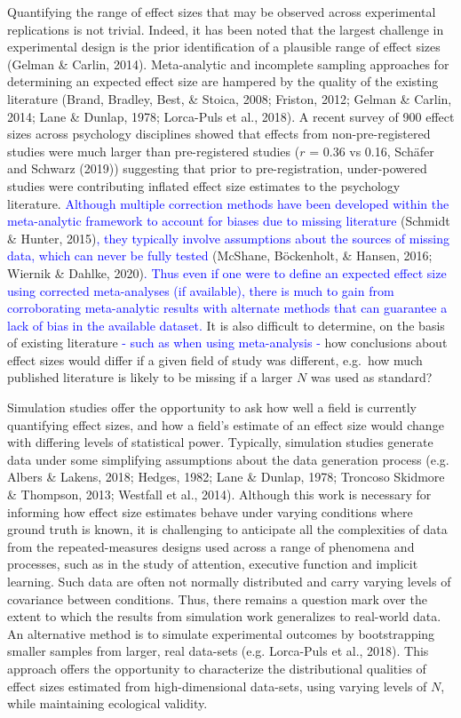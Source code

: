 \documentclass[
  man]{apa6}
\begin{document}
Quantifying the range of effect sizes that may be observed across experimental replications is not trivial. Indeed, it has been noted that the largest challenge in experimental design is the prior identification of a plausible range of effect sizes (Gelman \& Carlin, 2014). Meta-analytic and incomplete sampling approaches for determining an expected effect size are hampered by the quality of the existing literature (Brand, Bradley, Best, \& Stoica, 2008; Friston, 2012; Gelman \& Carlin, 2014; Lane \& Dunlap, 1978; Lorca-Puls et al., 2018). A recent survey of 900 effect sizes across psychology disciplines showed that effects from non-pre-registered studies were much larger than pre-registered studies (\(r\) = 0.36 vs 0.16, Schäfer and Schwarz (2019)) suggesting that prior to pre-registration, under-powered studies were contributing inflated effect size estimates to the psychology literature. \textcolor{blue}{Although multiple correction methods have been developed within the meta-analytic framework to account for biases due to missing literature} (Schmidt \& Hunter, 2015)\textcolor{blue}{, they typically involve assumptions about the sources of missing data, which can never be fully tested} (McShane, Böckenholt, \& Hansen, 2016; Wiernik \& Dahlke, 2020)\textcolor{blue}{. Thus even if one were to define an expected effect size using corrected meta-analyses (if available), there is much to gain from corroborating meta-analytic results with alternate methods that can guarantee a lack of bias in the available dataset.} It is also difficult to determine, on the basis of existing literature \textcolor{blue}{- such as when using meta-analysis -} how conclusions about effect sizes would differ if a given field of study was different, e.g.~how much published literature is likely to be missing if a larger \(N\) was used as standard?

Simulation studies offer the opportunity to ask how well a field is currently quantifying effect sizes, and how a field's estimate of an effect size would change with differing levels of statistical power. Typically, simulation studies generate data under some simplifying assumptions about the data generation process (e.g. Albers \& Lakens, 2018; Hedges, 1982; Lane \& Dunlap, 1978; Troncoso Skidmore \& Thompson, 2013; Westfall et al., 2014). Although this work is necessary for informing how effect size estimates behave under varying conditions where ground truth is known, it is challenging to anticipate all the complexities of data from the repeated-measures designs used across a range of phenomena and processes, such as in the study of attention, executive function and implicit learning. Such data are often not normally distributed and carry varying levels of covariance between conditions. Thus, there remains a question mark over the extent to which the results from simulation work generalizes to real-world data. An alternative method is to simulate experimental outcomes by bootstrapping smaller samples from larger, real data-sets (e.g. Lorca-Puls et al., 2018). This approach offers the opportunity to characterize the distributional qualities of effect sizes estimated from high-dimensional data-sets, using varying levels of \(N\), while maintaining ecological validity.
\end{document}
